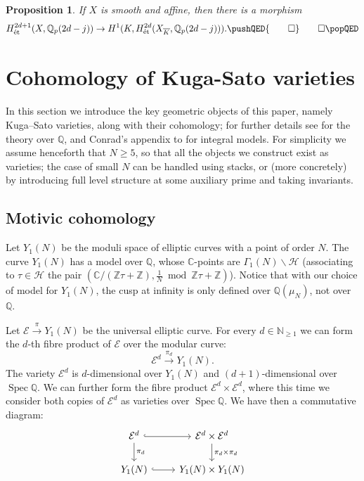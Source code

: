 \documentclass[11pt, a4paper, reqno]{amsart}
\theoremstyle{definition}
\theoremstyle{plain}
\newtheorem{proposition}[definition]{Proposition}
\theoremstyle{remark}
\DeclareMathOperator{\Spec}{Spec}
\DeclareMathOperator{\et}{\acute{e}t}
\newcommand{\numberset}{\mathbb}
\newcommand{\C}{\numberset{C}}
\newcommand{\Q}{\numberset{Q}}
\newcommand{\Z}{\numberset{Z}}
\newcommand{\N}{\numberset{N}}
\newcommand{\HP}{\mathcal{H}}
\newcommand{\Ell}{\mathcal{E}}
\renewcommand{\ge}{\geqslant}
\renewcommand{\geq}{\ge}
\newcommand{\myqed}{\pushQED{\qed} \qedhere \popQED}
\begin{document}
  \begin{proposition}
   \label{prop:morphism-for-affine-etale}
   If $X$ is smooth and affine, then there is a morphism
   \[
    H_{\et}^{2d+1}(X,\Q_p(2d-j)) \to H^1(K,H_{\et}^{2d}(X_{\overline{K}},\Q_p(2d-j))).\myqed
   \]
  \end{proposition}

\section{Cohomology of Kuga-Sato varieties}
\label{sec:cohomology-kuga-sato}

 In this section we introduce the key geometric objects of this paper, namely Kuga--Sato varieties, along with their cohomology; for further details see \cite{deligne69, scholl90} for the theory over $\Q$, and Conrad's appendix to \cite{BDP13} for integral models. For simplicity we assume henceforth that $N \geq 5$, so that all the objects we construct exist as varieties; the case of small $N$ can be handled using stacks, or (more concretely) by introducing full level structure at some auxiliary prime and taking invariants.

 \subsection{Motivic cohomology}

  Let $Y_1(N)$ be the moduli space of elliptic curves with a point of order $N$. The curve $Y_1(N)$ has a model over $\Q$, whose $\C$-points are $\Gamma_1(N) \backslash \HP$ (associating to $\tau \in \HP$ the pair $(\C / (\Z\tau + \Z), \tfrac{1}{N} \bmod \Z\tau + \Z)$). Notice that with our choice of model for $Y_1(N)$, the cusp at infinity is only defined over $\Q(\mu_N)$, not over $\Q$.

  Let $\Ell \xrightarrow{\pi} Y_1(N)$ be the universal elliptic curve. For every $d\in\N_{\geq 1}$ we can form the $d$-th fibre product of $\Ell$ over the modular curve:
  \[
   \Ell^d \xrightarrow{\pi_d} Y_1(N).
  \]
  The variety $\Ell^d$ is $d$-dimensional over $Y_1(N)$ and $(d+1)$-dimensional over $\Spec \Q$. We can further form the fibre product $\Ell^d \times \Ell^d$, where this time we consider both copies of $\Ell^d$ as varieties over $\Spec \Q$. We have then a commutative diagram:
  \[
   \begin{tikzcd}
    \Ell^d \arrow[hook]{r} \arrow["\pi_d"]{d} & \Ell^d \times \Ell^d \arrow["\pi_d \times \pi_d"]{d} \\
    Y_1(N) \arrow[hook]{r} & Y_1(N) \times Y_1(N)
   \end{tikzcd}
  \]
\end{document}
